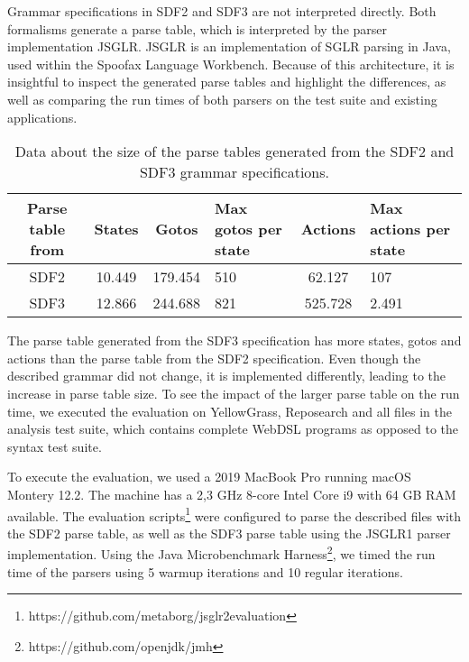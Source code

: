     Grammar specifications in SDF2 and SDF3 are not interpreted directly. Both formalisms generate a parse table, which is interpreted by the parser implementation JSGLR. JSGLR is an implementation of SGLR parsing in Java, used within the Spoofax Language Workbench. Because of this architecture, it is insightful to inspect the generated parse tables and highlight the differences, as well as comparing the run times of both parsers on the test suite and existing applications.

    \begin{table}[h]
      \begin{tabular}{ |c||c | c | p{2cm} | c | p{2.2cm}| }
        \hline
        Parse table from & States & Gotos & Max gotos per state & Actions & Max actions per state \\
        \hline\hline
        SDF2 & 10.449 & 179.454 & 510 & 62.127 & 107 \\
        \hline
        SDF3 & 12.866 & 244.688 & 821 & 525.728 & 2.491 \\
        \hline
      \end{tabular}
      \caption{\label{tbl:parse-table-differences}Data about the size of the parse tables generated from the SDF2 and SDF3 grammar specifications.}
    \end{table}

    The parse table generated from the SDF3 specification has more states, gotos and actions than the parse table from the SDF2 specification. Even though the described grammar did not change, it is implemented differently, leading to the increase in parse table size. To see the impact of the larger parse table on the run time, we executed the evaluation on YellowGrass, Reposearch and all files in the analysis test suite, which contains complete WebDSL programs as opposed to the syntax test suite.

    To execute the evaluation, we used a 2019 MacBook Pro running macOS Montery 12.2. The machine has a 2,3 GHz 8-core Intel Core i9 with 64 GB RAM available. The evaluation scripts\footnote{https://github.com/metaborg/jsglr2evaluation} were configured to parse the described files with the SDF2 parse table, as well as the SDF3 parse table using the JSGLR1 parser implementation. Using the Java Microbenchmark Harness\footnote{https://github.com/openjdk/jmh}, we timed the run time of the parsers using 5 warmup iterations and 10 regular iterations.

